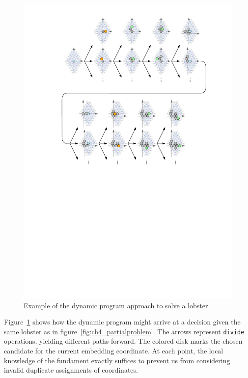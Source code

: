 \begin{figure}
    \centering
    \includegraphics{graphics/ch4_dpexample.pdf}
    \caption{Example of the dynamic program approach to solve a lobster.}
    \label{fig:ch4_dpexample}
\end{figure}

Figure~\ref{fig:ch4_dpexample} shows how the dynamic program might arrive at a decision given the same lobster as in figure~\ref{fig:ch4_partialproblem}. The arrows represent \texttt{divide} operations, yielding different paths forward. The colored disk marks the chosen candidate for the current embedding coordinate. At each point, the local knowledge of the fundament exactly suffices to prevent us from considering invalid duplicate assignments of coordinates.

